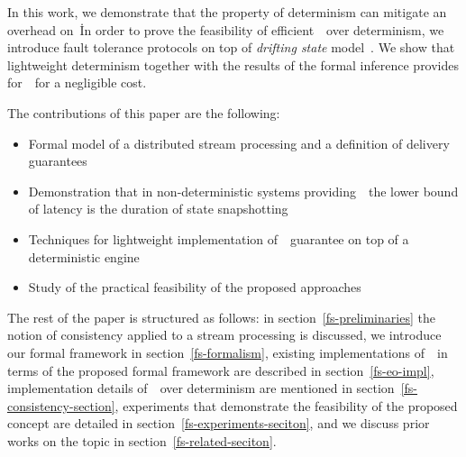 In this work, we demonstrate that the property of determinism can mitigate an overhead on~\eo\. 
In order to prove the feasibility of efficient~\eo\ over determinism, we introduce  fault tolerance protocols on top of {\em drifting state} model~\cite{we2018adbis}. 
We show that lightweight determinism together with the results of the formal inference provides for~\eo\ for a negligible  cost.

The contributions of this paper are the following: 
\begin{itemize}
    \item Formal model of a distributed stream processing  and   a   definition of  delivery guarantees 
    \item Demonstration that in non-deterministic systems providing~\eo\, the lower bound of latency is the duration of state snapshotting
    \item Techniques for lightweight implementation of~\eo\ guarantee on top of a deterministic engine
    \item Study of the practical feasibility of the proposed approaches
\end{itemize}

The rest of the paper is structured as follows: 
in section~\ref{fs-preliminaries} the notion of consistency applied to a stream processing is discussed, 
we introduce our formal framework in section~\ref{fs-formalism}, 
existing implementations of~\eo\ in terms of the proposed formal framework are described in section~\ref{fs-eo-impl}, 
implementation details of~\eo\ over determinism are mentioned in section~\ref{fs-consistency-section}, 
experiments that demonstrate the feasibility of the proposed concept are detailed in section~\ref{fs-experiments-seciton}, 
and we discuss prior works on the topic in section~\ref{fs-related-seciton}. 
